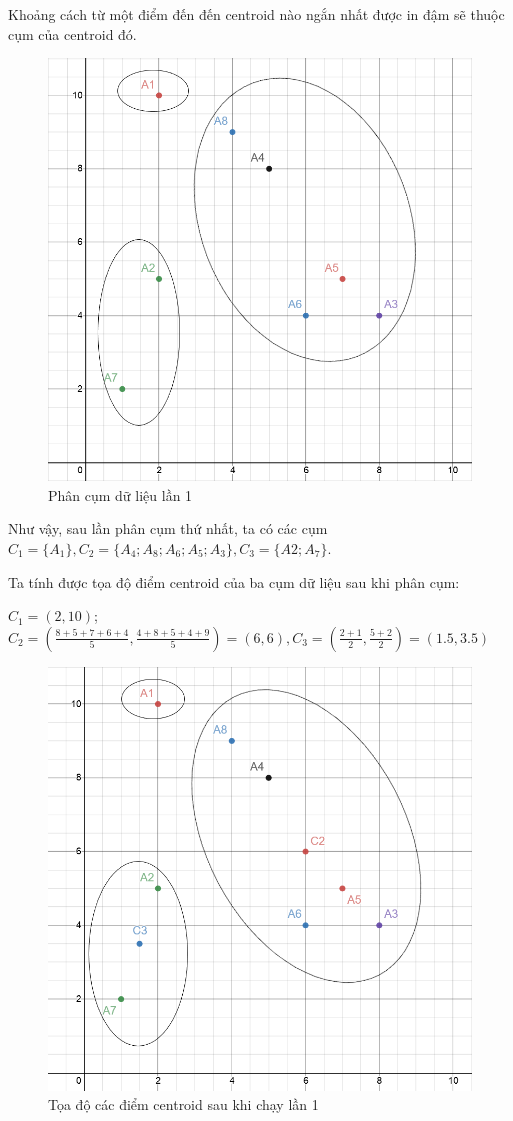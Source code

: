 \documentclass{article}
\begin{document}
	\newpage
	Khoảng cách từ một điểm đến đến centroid nào ngắn nhất được in đậm sẽ thuộc cụm của centroid đó.
	\begin{figure}[h]
		\centering
		\includegraphics[width=0.6\linewidth]{img/ex_2}
		\caption{Phân cụm dữ liệu lần 1}
	\end{figure}\par
	Như vậy, sau lần phân cụm thứ nhất, ta có các cụm $C_1 = \{A_1\}, C_2 = \{A_4; A_8; A_6; A_5; A_3\}, C_3 = \{A2; A_7\}$.\par
	\newpage
	Ta tính được tọa độ điểm centroid của ba cụm dữ liệu sau khi phân cụm:\par
	\medskip
	$C_1 = (2, 10)$; $C_2 = \left(\frac{8+5+7+6+4}{5}, \frac{4+8+5+4+9}{5}\right) = (6,6), C_3 = \left(\frac{2+1}{2}, \frac{5+2}{2}\right) = (1.5, 3.5)$\par
	\begin{figure}[h]
		\centering
		\includegraphics[width=0.6\linewidth]{img/ex_3}
		\caption{Tọa độ các điểm centroid sau khi chạy lần 1}
	\end{figure}\par
\end{document}
